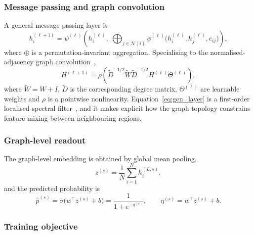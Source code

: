 \documentclass[11pt,reqno]{amsart}
\theoremstyle{plain}
\theoremstyle{definition}
\theoremstyle{remark}
\numberwithin{equation}{section}
\begin{document}
\subsubsection{Message passing and graph convolution}

A general message passing layer is~\cite{gilmer2017neural}
\begin{equation}
h_i^{(\ell+1)}
= \psi^{(\ell)}\!\left(
  h_i^{(\ell)},\;
  \bigoplus_{j\in\mathcal{N}(i)} \phi^{(\ell)}\big(h_i^{(\ell)},h_j^{(\ell)},e_{ij}\big)
\right),
\end{equation}
where $\oplus$ is a permutation-invariant aggregation. Specialising to the
normalised-adjacency graph convolution~\cite{kipf2017semi},
\begin{equation}
\label{eq:gcn_layer}
H^{(\ell+1)}
= \rho\!\left(
  \widetilde D^{-1/2}\widetilde W \widetilde D^{-1/2} H^{(\ell)} \Theta^{(\ell)}
\right),
\end{equation}
where $\widetilde W = W + I$, $\widetilde D$ is the corresponding degree matrix,
$\Theta^{(\ell)}$ are learnable weights and $\rho$ is a pointwise nonlinearity.
Equation~\eqref{eq:gcn_layer} is a first-order localised spectral
filter~\cite{defferrard2016convolutional}, and it makes explicit how the graph
topology constrains feature mixing between neighbouring regions.

\subsubsection{Graph-level readout}

The graph-level embedding is obtained by global mean pooling,
\begin{equation}
z^{(s)} = \frac{1}{N}\sum_{i=1}^{N} h_i^{(L,s)},
\end{equation}
and the predicted probability is
\begin{equation}
\hat p^{(s)} = \sigma\big(w^{\top} z^{(s)} + b\big)
= \frac{1}{1+e^{-\eta^{(s)}}},
\qquad
\eta^{(s)} = w^{\top} z^{(s)} + b .
\end{equation}

\subsubsection{Training objective}
\end{document}
